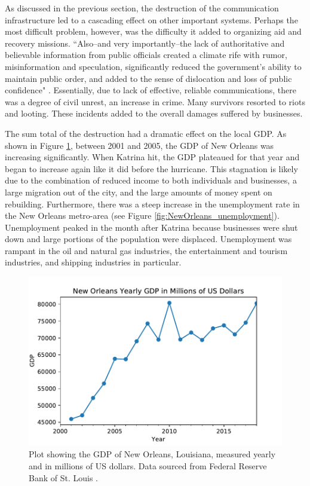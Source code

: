 \documentclass[%
 reprint,
 amsmath,amssymb,
 aps,
]{revtex4-1}
\begin{document}
As discussed in the previous section, the destruction of the communication infrastructure led to a cascading effect on other important systems. Perhaps the most difficult problem, however, was the difficulty it added to organizing aid and recovery missions. ``Also--and very importantly--the lack of authoritative and believable information from public officials created a climate rife with rumor, misinformation and speculation, significantly reduced the government's ability to maintain public order, and added to the sense of dislocation and loss of public confidence" \cite{MillerPaper}. Essentially, due to lack of effective, reliable communications, there was a degree of civil unrest, an increase in crime. Many survivors resorted to riots and looting. These incidents added to the overall damages suffered by businesses.

The sum total of the destruction had a dramatic effect on the local GDP. As shown in Figure \ref{fig:NewOrleans_GDP}, between 2001 and 2005, the GDP of New Orleans was increasing significantly. When Katrina hit, the GDP plateaued for that year and began to increase again like it did before the hurricane. This stagnation is likely due to the combination of reduced income to both individuals and businesses, a large migration out of the city, and the large amounts of money spent on rebuilding. Furthermore, there was a steep increase in the unemployment rate in the New Orleans metro-area (see Figure \ref{fig:NewOrleans_unemployment}). Unemployment peaked in the month after Katrina because businesses were shut down and large portions of the population were displaced. Unemployment was rampant in the oil and natural gas industries, the entertainment and tourism industries, and shipping industries in particular.

\begin{figure}
	\includegraphics[scale=0.6]{plot_NewOrleans_GDP.pdf}
	\centering
	\caption{Plot showing the GDP of New Orleans, Louisiana, measured yearly and in millions of US dollars. Data sourced from Federal Reserve Bank of St. Louis \cite{NOLA_GDP_data}.}
	\label{fig:NewOrleans_GDP}
\end{figure}
\end{document}
